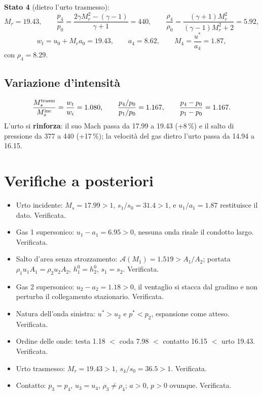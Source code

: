 \documentclass[11pt,a4paper]{article}
\newcommand{\Mr}{M_{r}}
\newcommand{\Ms}{M_{s}}
\newcommand{\Ar}{\mathcal{A}}
\begin{document}
\textbf{Stato 4} (dietro l'urto trasmesso):
\[
  \Mr=\num{19.43},\qquad \frac{p_4}{p_0}=\frac{2\gamma\Mr^2-(\gamma-1)}{\gamma+1}=\num{440},\qquad
  \frac{\rho_4}{\rho_0}=\frac{(\gamma+1)\Mr^2}{(\gamma-1)\Mr^2+2}=\num{5.92},
\]
\[
  w_t=u_0+\Mr a_0=\num{19.43},\qquad a_4=\num{8.62},\qquad M_4=\frac{u^*}{a_4}=\num{1.87},
\]
con $\rho_4=\num{8.29}$.

\subsection{Variazione d'intensità}
\[
  \frac{\Ms^{\rm trasm}}{\Ms^{\rm inc}}=\frac{w_t}{w_i}=\num{1.080},\qquad
  \frac{p_4/p_0}{p_1/p_0}=\num{1.167},\qquad
  \frac{p_4-p_0}{p_1-p_0}=\num{1.167}.
\]
L'urto si \textbf{rinforza}: il suo Mach passa da \num{17.99} a \num{19.43} (+8\,\%) e il salto di pressione da
\num{377} a \num{440} (+17\,\%); la velocità del gas dietro l'urto passa da \num{14.94} a \num{16.15}.

\section{Verifiche a posteriori}
\begin{itemize}
  \item Urto incidente: $\Ms=\num{17.99}>1$, $s_1/s_0=\num{31.4}>1$, e $u_1/a_1=\num{1.87}$ restituisce il dato. Verificata.
  \item Gas 1 supersonico: $u_1-a_1=\num{6.95}>0$, nessuna onda risale il condotto largo. Verificata.
  \item Salto d'area senza strozzamento: $\Ar(M_1)=\num{1.519}>A_1/A_2$; portata $\rho_1u_1A_1=\rho_2u_2A_2$,
    $h^0_1=h^0_2$, $s_1=s_2$. Verificata.
  \item Gas 2 supersonico: $u_2-a_2=\num{1.18}>0$, il ventaglio si stacca dal gradino e non perturba il collegamento
    stazionario. Verificata.
  \item Natura dell'onda sinistra: $u^*>u_2$ e $p^*<p_2$, espansione come atteso. Verificata.
  \item Ordine delle onde: testa \num{1.18} $<$ coda \num{7.98} $<$ contatto \num{16.15} $<$ urto \num{19.43}. Verificata.
  \item Urto trasmesso: $\Mr=\num{19.43}>1$, $s_4/s_0=\num{36.5}>1$. Verificata.
  \item Contatto: $p_3=p_4$, $u_3=u_4$, $\rho_3\neq\rho_4$; $a>0$, $p>0$ ovunque. Verificata.
\end{itemize}
\end{document}
